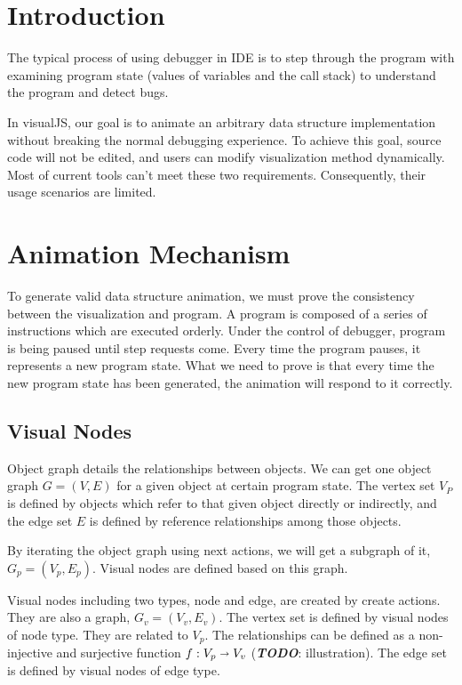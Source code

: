 \documentclass[11pt]{article}
\begin{document}
\section{Introduction}
The typical process of using debugger in IDE is to step through the program with examining program state (values of variables and the call stack) to understand the program and detect bugs.

\noindent In visualJS, our goal is to animate an arbitrary data structure implementation without breaking the normal debugging experience. To achieve this goal, source code will not be edited, and users can modify visualization method dynamically. Most of current tools can't meet these two requirements. Consequently, their usage scenarios are limited. 

\section{Animation Mechanism}
To generate valid data structure animation, we must prove the consistency between the visualization and program. A program is composed of a series of instructions which are executed orderly. Under the control of debugger, program is being paused until step requests come. Every time the program pauses, it represents a new program state. What we need to prove is that every time the new program state has been generated, the animation will respond to it correctly.

\subsection{Visual Nodes}
Object graph details the relationships between objects. We can get one object graph \(G = (V, E)\) for a given object at certain program state. The vertex set $V_P$ is defined by objects which refer to that given object directly or indirectly, and the edge set $E$ is defined by reference relationships among those objects.

\noindent By iterating the object graph using next actions, we will get a subgraph of it, \(G_p = (V_p, E_p)\). Visual nodes are defined based on this graph. 

\noindent Visual nodes including two types, node and edge, are created by create actions. They are also a graph, \(G_v = (V_v, E_v)\). The vertex set is defined by visual nodes of node type. They are related to $V_p$. The relationships can be defined as a non-injective and surjective function \(f:V_p\shortrightarrow V_v\) (\textbf{\textit{TODO}}: illustration). The edge set is defined by visual nodes of edge type.
\end{document}
